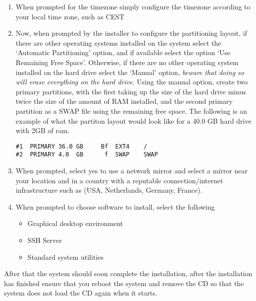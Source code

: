 \begin{enumerate}
\item When prompted for the timezone simply configure the timezone according to your local time zone, such as CEST

\item Now, when prompted by the installer to configure the partitioning layout, if there are other operating systems installed on the system 
select the `Automatic Partitioning' option, and if available select the option `Use Remaining Free Space'. Otherwise, if there are no other 
operating system installed on the hard drive select the `Manual' option, \emph{beware that doing so will erase everything on the hard drive}.
Using the manual option, create two primary partitions, with the first taking up the size of the hard drive minus twice the size of the amount
of RAM installed, and the second primary partition as a SWAP file using the remaining free space. The following is an example of what the partiton
layout would look like for a 40.0 GB hard drive with 2GB of ram.

\flushleft
\lstset{caption=Manual Partition Layout Example}
\begin{lstlisting}
#1	PRIMARY	36.0 GB		Bf	EXT4	/
#2	PRIMARY	4.0  GB		 f	SWAP	SWAP
\end{lstlisting}

\item When prompted, select yes to use a network mirror and select a mirror near your location and in a country with a reputable 
connection/internet infrastructure such as (USA, Netherlands, Germany, France).

\item When prompted to choose software to install, select the following
\begin{itemize}
\item 	Graphical desktop environment
\item 	SSH Server
\item	Standard system utilities
\end{itemize}
\end{enumerate}

\item After that the system should soon complete the installation, after the installation has finished ensure that you reboot the system and remove
the CD so that the system does not load the CD again when it starts.

